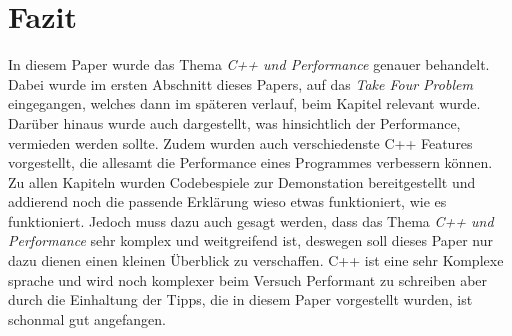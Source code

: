 \section{Fazit}\label{sec:fazit}
In diesem Paper wurde das Thema \emph{C++ und Performance} genauer behandelt. Dabei wurde im
ersten Abschnitt dieses Papers, auf das \emph{Take Four Problem} eingegangen, welches dann im
späteren verlauf, beim Kapitel \emph{} relevant wurde. Darüber
hinaus wurde auch dargestellt, was hinsichtlich der Performance, vermieden werden sollte. Zudem
wurden auch verschiedenste C++ Features vorgestellt, die allesamt die Performance eines
Programmes verbessern können. Zu allen Kapiteln wurden Codebespiele zur Demonstation
bereitgestellt und addierend noch die passende Erklärung wieso etwas funktioniert, wie es
funktioniert. Jedoch muss dazu auch gesagt werden, dass das Thema \emph{C++ und Performance} sehr
komplex und weitgreifend ist, deswegen soll dieses Paper nur dazu dienen einen kleinen Überblick
zu verschaffen. C++ ist eine sehr Komplexe sprache und wird noch komplexer beim Versuch
Performant zu schreiben aber durch die Einhaltung der Tipps, die in diesem Paper vorgestellt
wurden, ist schonmal gut angefangen.